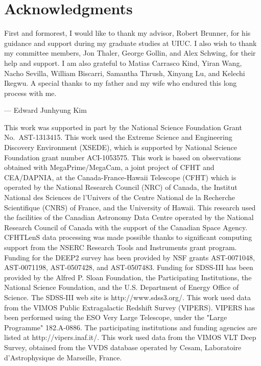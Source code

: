 \documentclass[12pt,edeposit,fullpage]{uiucthesis2014}
\begin{document}
\chapter*{Acknowledgments}

First and formorest, I would like to thank my advisor, Robert Brunner, for his guidance and support
during my graduate studies at UIUC.
I also wish to thank my committee members, Jon Thaler, George Gollin, and Alex Schwing, for their help and support.
I am also grateful to Matias Carrasco Kind, Yiran Wang, Nacho Sevilla, William Biscarri, Samantha Thrush, Xinyang Lu, and Kelechi Ikegwu.
A special thanks to my father and my wife who endured this long process with me.

\begin{flushright}
--- Edward Junhyung Kim
\end{flushright}

\vspace{10mm}

This work was supported in part by the National Science Foundation Grant
No.\ AST-1313415.
This work used the Extreme Science and Engineering Discovery Environment
(XSEDE), which is supported by National Science Foundation grant number
ACI-1053575.
This work is based on observations obtained with MegaPrime/MegaCam, a
joint project of CFHT and CEA/DAPNIA, at the Canada-France-Hawaii
Telescope (CFHT) which is operated by the National Research Council
(NRC) of Canada, the Institut National des Sciences de l'Univers of
the Centre National de la Recherche Scientifique (CNRS) of France, and
the University of Hawaii. This research used the facilities of the
Canadian Astronomy Data Centre operated by the National Research
Council of Canada with the support of the Canadian Space Agency.
CFHTLenS data processing was made possible thanks to significant
computing support from the NSERC Research Tools and Instruments grant
program.
Funding for the DEEP2 survey has been provided by NSF grants AST-0071048,
AST-0071198, AST-0507428, and AST-0507483. 
Funding for SDSS-III has been provided by the Alfred P. Sloan Foundation, the
Participating Institutions, the National Science Foundation, and the U.S.
Department of Energy Office of Science. The SDSS-III web site is
http://www.sdss3.org/.
This work used data from the 
VIMOS Public Extragalactic Redshift Survey (VIPERS).
VIPERS has been performed using the ESO Very Large Telescope, under the "Large
Programme" 182.A-0886. The participating institutions and funding agencies are
listed at http://vipers.inaf.it/.
This work used data from the VIMOS VLT Deep Survey, obtained from the VVDS
database operated by Cesam, Laboratoire d'Astrophysique de Marseille, France.
\end{document}
